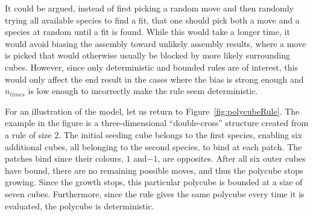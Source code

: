 It could be argued, instead of first picking a random move and then randomly trying all available species to find a fit, that one should pick both a move and a species at random until a fit is found. While this would take a longer time, it would avoid biasing the assembly toward unlikely assembly results, where a move is picked that would otherwise usually be blocked by more likely surrounding cubes. However, since only deterministic and bounded rules are of interest, this would only affect the end result in the cases where the bias is strong enough and \(n_{times}\) is low enough to incorrectly make the rule seem deterministic.


For an illustration of the model, let us return to Figure~\ref{fig:polycubeRule}. The example in the figure is a three-dimensional ``double-cross'' structure created from a rule of size 2. The initial seeding cube belongs to the first species, enabling six additional cubes, all belonging to the second species, to bind at each patch. The patches bind since their colours, \(1\) and\( -1\), are opposites. After all six outer cubes have bound, there are no remaining possible moves, and thus the polycube stops growing. Since the growth stops, this particular polycube is bounded at a size of seven cubes. Furthermore, since the rule gives the same polycube every time it is evaluated, the polycube is deterministic.




